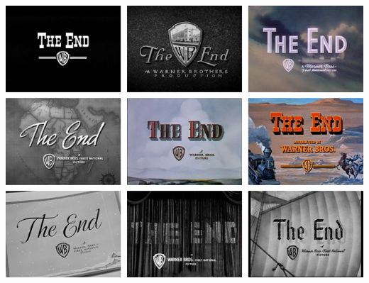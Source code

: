 \begin{frame}
   \centering
   \includegraphics[height=.99\textheight]{img/the-end.png} \\
\end{frame}

